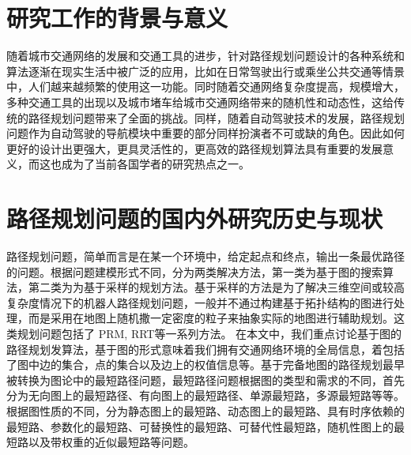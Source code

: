 \documentclass{standalone}
\begin{document}
\thesischapterexordium

\section{研究工作的背景与意义}
随着城市交通网络的发展和交通工具的进步，针对路径规划问题设计的各种系统和算法逐渐在现实生活中被广泛的应用，比如在日常驾驶出行或乘坐公共交通等情景中，人们越来越频繁的使用这一功能。同时随着交通网络复杂度提高，规模增大，多种交通工具的出现以及城市堵车给城市交通网络带来的随机性和动态性，这给传统的路径规划问题带来了全面的挑战。同样，随着自动驾驶技术的发展，路径规划问题作为自动驾驶的导航模块中重要的部分同样扮演者不可或缺的角色。因此如何更好的设计出更强大，更具灵活性的，更高效的路径规划算法具有重要的发展意义，而这也成为了当前各国学者的研究热点之一。


\section{路径规划问题的国内外研究历史与现状}
路径规划问题，简单而言是在某一个环境中，给定起点和终点，输出一条最优路径的问题。根据问题建模形式不同，分为两类解决方法，第一类为基于图的搜索算法，第二类为为基于采样的规划方法。基于采样的方法是为了解决三维空间或较高复杂度情况下的机器人路径规划问题，一般并不通过构建基于拓扑结构的图进行处理，而是采用在地图上随机撒一定密度的粒子来抽象实际的地图进行辅助规划。这类规划问题包括了 PRM, RRT等一系列方法。
在本文中，我们重点讨论基于图的路径规划发算法，基于图的形式意味着我们拥有交通网络环境的全局信息，着包括了图中边的集合，点的集合以及边上的权值信息等。基于完备地图的路径规划最早被转换为图论中的最短路径问题，最短路径问题根据图的类型和需求的不同，首先分为无向图上的最短路径、有向图上的最短路径、单源最短路，多源最短路等等。根据图性质的不同，分为静态图上的最短路、动态图上的最短路、具有时序依赖的最短路、参数化的最短路、可替换性的最短路、可替代性最短路，随机性图上的最短路以及带权重的近似最短路等问题。\par
\end{document}
